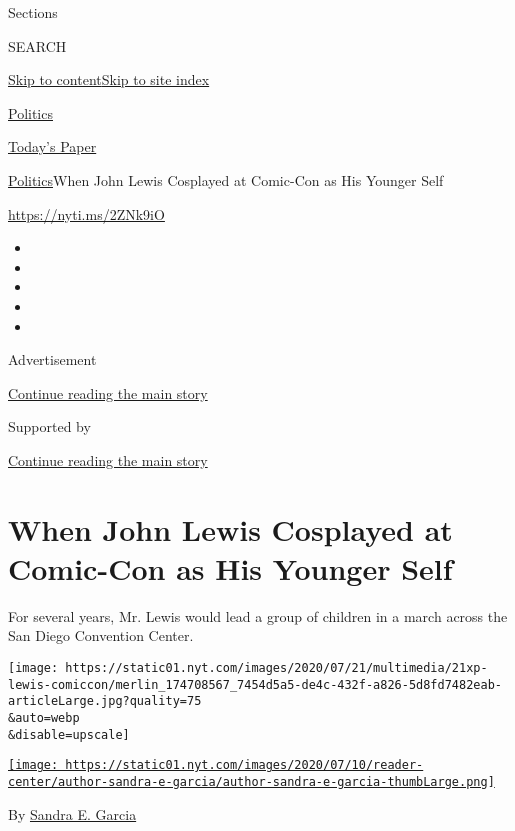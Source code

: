 Sections

SEARCH

\protect\hyperlink{site-content}{Skip to
content}\protect\hyperlink{site-index}{Skip to site index}

\href{https://www.nytimes.com/section/politics}{Politics}

\href{https://myaccount.nytimes.com/auth/login?response_type=cookie\&client_id=vi}{}

\href{https://www.nytimes.com/section/todayspaper}{Today's Paper}

\href{/section/politics}{Politics}\textbar{}When John Lewis Cosplayed at
Comic-Con as His Younger Self

\url{https://nyti.ms/2ZNk9iO}

\begin{itemize}
\item
\item
\item
\item
\item
\end{itemize}

Advertisement

\protect\hyperlink{after-top}{Continue reading the main story}

Supported by

\protect\hyperlink{after-sponsor}{Continue reading the main story}

\hypertarget{when-john-lewis-cosplayed-at-comic-con-as-his-younger-self}{%
\section{When John Lewis Cosplayed at Comic-Con as His Younger
Self}\label{when-john-lewis-cosplayed-at-comic-con-as-his-younger-self}}

For several years, Mr. Lewis would lead a group of children in a march
across the San Diego Convention Center.

\texttt{[image: https://static01.nyt.com/images/2020/07/21/multimedia/21xp-lewis-comiccon/merlin\_174708567\_7454d5a5-de4c-432f-a826-5d8fd7482eab-articleLarge.jpg?quality=75\\\&auto=webp\\\&disable=upscale]}

\href{https://www.nytimes.com/by/sandra-e-garcia}{\texttt{[image: https://static01.nyt.com/images/2020/07/10/reader-center/author-sandra-e-garcia/author-sandra-e-garcia-thumbLarge.png]}}

By \href{https://www.nytimes.com/by/sandra-e-garcia}{Sandra E. Garcia}

